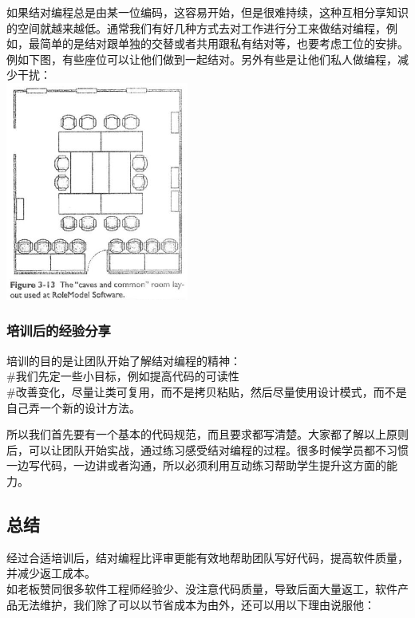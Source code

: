 如果结对编程总是由某一位编码，这容易开始，但是很难持续，这种互相分享知识的空间就越来越低。通常我们有好几种方式去对工作进行分工来做结对编程，例如，最简单的是结对跟单独的交替或者共用跟私有结对等，也要考虑工位的安排。例如下图，有些座位可以让他们做到一起结对。另外有些是让他们私人做编程，减少干扰：\\

\includegraphics[width=6cm]{acp3-13.jpg}

\hypertarget{ux57f9ux8badux540eux7684ux7ecfux9a8cux5206ux4eab}{%
\subsubsection{培训后的经验分享}\label{ux57f9ux8badux540eux7684ux7ecfux9a8cux5206ux4eab}}

培训的目的是让团队开始了解结对编程的精神：\\
\#我们先定一些小目标，例如提高代码的可读性\\
\#改善变化，尽量让类可复用，而不是拷贝粘贴，然后尽量使用设计模式，而不是自己弄一个新的设计方法。

所以我们首先要有一个基本的代码规范，而且要求都写清楚。大家都了解以上原则后，可以让团队开始实战，通过练习感受结对编程的过程。很多时候学员都不习惯一边写代码，一边讲或者沟通，所以必须利用互动练习帮助学生提升这方面的能力。

\hypertarget{ux603bux7ed3}{%
\subsection{总结}\label{ux603bux7ed3}}

经过合适培训后，结对编程比评审更能有效地帮助团队写好代码，提高软件质量，并减少返工成本。\\
如老板赞同很多软件工程师经验少、没注意代码质量，导致后面大量返工，软件产品无法维护，我们除了可以以节省成本为由外，还可以用以下理由说服他：

